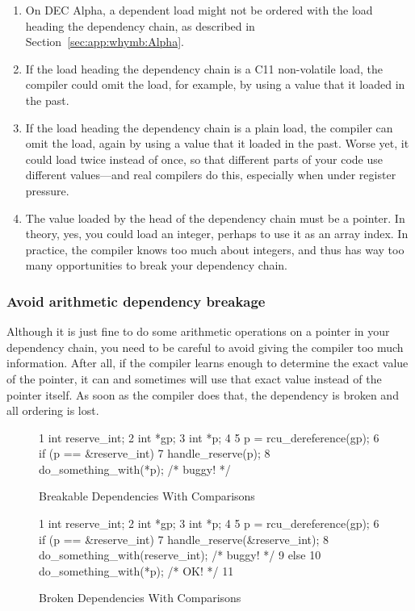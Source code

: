 \begin{enumerate}
\item	On DEC Alpha, a dependent load might not be ordered with
	the load heading the dependency chain, as described in
	Section~\ref{sec:app:whymb:Alpha}.
\item	If the load heading the dependency chain is a
	C11 non-volatile  load,
	the compiler could omit the load, for example, by using a value
	that it loaded in the past.
\item	If the load heading the dependency chain is a plain load,
	the compiler can omit the load, again by using a value
	that it loaded in the past.
	Worse yet, it could load twice instead of once, so that
	different parts of your code use different values---and
	real compilers do this, especially when under register
	pressure.
\item	The value loaded by the head of the dependency chain must
	be a pointer.
	In theory, yes, you could load an integer, perhaps to use
	it as an array index.
	In practice, the compiler knows too much about integers,
	and thus has way too many opportunities to break your
	dependency chain.
\end{enumerate}

\subsubsection{Avoid arithmetic dependency breakage}
Although it is just fine to do some arithmetic operations on a pointer in
your dependency chain, you need to be careful to avoid giving the
compiler too much information.
After all, if the compiler learns enough to determine the exact value
of the pointer, it can and sometimes will use that exact value instead
of the pointer itself.
As soon as the compiler does that, the dependency is broken and all
ordering is lost.

\begin{figure}[tbp]
{ \scriptsize
\begin{verbbox}
 1 int reserve_int;
 2 int *gp;
 3 int *p;
 4
 5 p = rcu_dereference(gp);
 6 if (p == &reserve_int)
 7   handle_reserve(p);
 8 do_something_with(*p); /* buggy! */
\end{verbbox}
}
\centering
\theverbbox
\caption{Breakable Dependencies With Comparisons}
\label{fig:memorder:Breakable Dependencies With Comparisons}
\end{figure}

\begin{figure}[tbp]
{ \scriptsize
\begin{verbbox}
 1 int reserve_int;
 2 int *gp;
 3 int *p;
 4
 5 p = rcu_dereference(gp);
 6 if (p == &reserve_int) {
 7   handle_reserve(&reserve_int);
 8   do_something_with(reserve_int); /* buggy! */
 9 } else {
10   do_something_with(*p); /* OK! */
11 }
\end{verbbox}
}
\centering
\theverbbox
\caption{Broken Dependencies With Comparisons}
\label{fig:memorder:Broken Dependencies With Comparisons}
\end{figure}

